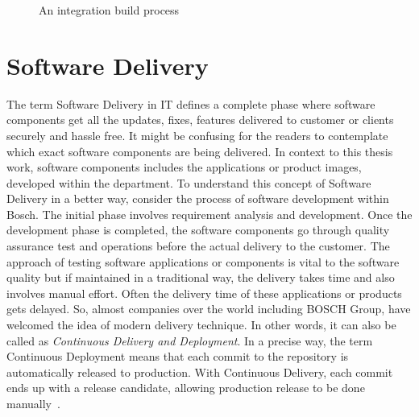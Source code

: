 \vspace{0.5cm}
\begin{figure}[H]
%
\caption[Continuous Integration approach]{An integration build process\footnotemark}
\label{fig:Continuous Integration approach}
\end{figure}
\vspace{0.5cm}

\section{Software Delivery}\label{section:SoftwareDelivery}

The term Software Delivery in IT defines a complete phase where software components get all the updates, fixes, features delivered to customer or clients securely and hassle free. It might be confusing for the readers to contemplate which exact software components are being delivered. In context to this thesis work, software components includes the applications or product images, developed within the department. To understand this concept of Software Delivery in a better way, consider the process of software development within Bosch. The initial phase involves requirement analysis and development. Once the development phase is completed, the software components go through quality assurance test and operations before the actual delivery to the customer. The approach of testing software applications or components is vital to the software quality but if maintained in a traditional way, the delivery takes time and also involves manual effort. Often the delivery time of these applications or products gets delayed. So, almost companies over the world including BOSCH Group, have welcomed the idea of modern delivery technique. In other words, it can also be called as \emph{Continuous Delivery and Deployment}. In a precise way, the term Continuous Deployment means that each commit to the repository is automatically released to production. With Continuous Delivery, each commit ends up with a release candidate, allowing production release to be done manually~\parencite{leszko2017continuous}.

